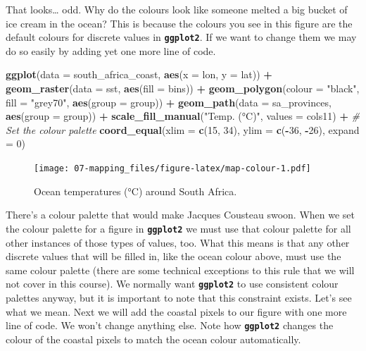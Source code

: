 \documentclass[]{book}
\newenvironment{Shaded}{\begin{snugshade}}{\end{snugshade}}
\newcommand{\KeywordTok}[1]{\textcolor[rgb]{0.13,0.29,0.53}{\textbf{#1}}}
\newcommand{\DataTypeTok}[1]{\textcolor[rgb]{0.13,0.29,0.53}{#1}}
\newcommand{\DecValTok}[1]{\textcolor[rgb]{0.00,0.00,0.81}{#1}}
\newcommand{\StringTok}[1]{\textcolor[rgb]{0.31,0.60,0.02}{#1}}
\newcommand{\CommentTok}[1]{\textcolor[rgb]{0.56,0.35,0.01}{\textit{#1}}}
\newcommand{\OperatorTok}[1]{\textcolor[rgb]{0.81,0.36,0.00}{\textbf{#1}}}
\newcommand{\NormalTok}[1]{#1}
\theoremstyle{definition}
\theoremstyle{definition}
\theoremstyle{definition}
\theoremstyle{remark}
\begin{document}
That looks\ldots{} odd. Why do the colours look like someone melted a
big bucket of ice cream in the ocean? This is because the colours you
see in this figure are the default colours for discrete values in
\textbf{\texttt{ggplot2}}. If we want to change them we may do so easily
by adding yet one more line of code.

\begin{Shaded}
\begin{Highlighting}[]
\KeywordTok{ggplot}\NormalTok{(}\DataTypeTok{data =}\NormalTok{ south_africa_coast, }\KeywordTok{aes}\NormalTok{(}\DataTypeTok{x =}\NormalTok{ lon, }\DataTypeTok{y =}\NormalTok{ lat)) }\OperatorTok{+}
\StringTok{  }\KeywordTok{geom_raster}\NormalTok{(}\DataTypeTok{data =}\NormalTok{ sst, }\KeywordTok{aes}\NormalTok{(}\DataTypeTok{fill =}\NormalTok{ bins)) }\OperatorTok{+}
\StringTok{  }\KeywordTok{geom_polygon}\NormalTok{(}\DataTypeTok{colour =} \StringTok{"black"}\NormalTok{, }\DataTypeTok{fill =} \StringTok{"grey70"}\NormalTok{, }\KeywordTok{aes}\NormalTok{(}\DataTypeTok{group =}\NormalTok{ group)) }\OperatorTok{+}
\StringTok{  }\KeywordTok{geom_path}\NormalTok{(}\DataTypeTok{data =}\NormalTok{ sa_provinces, }\KeywordTok{aes}\NormalTok{(}\DataTypeTok{group =}\NormalTok{ group)) }\OperatorTok{+}
\StringTok{  }\KeywordTok{scale_fill_manual}\NormalTok{(}\StringTok{"Temp. (°C)"}\NormalTok{, }\DataTypeTok{values =}\NormalTok{ cols11) }\OperatorTok{+}\StringTok{ }\CommentTok{# Set the colour palette}
\StringTok{  }\KeywordTok{coord_equal}\NormalTok{(}\DataTypeTok{xlim =} \KeywordTok{c}\NormalTok{(}\DecValTok{15}\NormalTok{, }\DecValTok{34}\NormalTok{), }\DataTypeTok{ylim =} \KeywordTok{c}\NormalTok{(}\OperatorTok{-}\DecValTok{36}\NormalTok{, }\OperatorTok{-}\DecValTok{26}\NormalTok{), }\DataTypeTok{expand =} \DecValTok{0}\NormalTok{)}
\end{Highlighting}
\end{Shaded}

\begin{figure}
\centering
\texttt{[image: 07-mapping\_files/figure-latex/map-colour-1.pdf]}
\caption{\label{fig:map-colour}Ocean temperatures (°C) around South Africa.}
\end{figure}

There's a colour palette that would make Jacques Cousteau swoon. When we
set the colour palette for a figure in \textbf{\texttt{ggplot2}} we must
use that colour palette for all other instances of those types of
values, too. What this means is that any other discrete values that will
be filled in, like the ocean colour above, must use the same colour
palette (there are some technical exceptions to this rule that we will
not cover in this course). We normally want \textbf{\texttt{ggplot2}} to
use consistent colour palettes anyway, but it is important to note that
this constraint exists. Let's see what we mean. Next we will add the
coastal pixels to our figure with one more line of code. We won't change
anything else. Note how \textbf{\texttt{ggplot2}} changes the colour of
the coastal pixels to match the ocean colour automatically.
\end{document}
